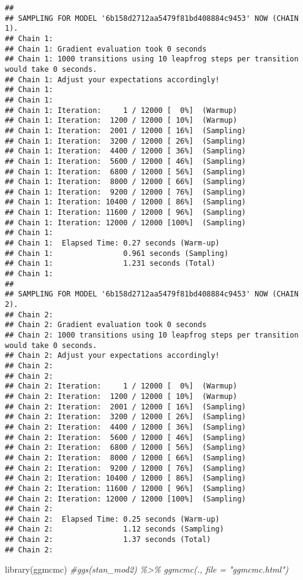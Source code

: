 \documentclass[
]{book}
\newenvironment{Shaded}{\begin{snugshade}}{\end{snugshade}}
\newcommand{\CommentTok}[1]{\textcolor[rgb]{0.56,0.35,0.01}{\textit{#1}}}
\newcommand{\FunctionTok}[1]{\textcolor[rgb]{0.00,0.00,0.00}{#1}}
\newcommand{\NormalTok}[1]{#1}
\begin{document}
\begin{verbatim}
## 
## SAMPLING FOR MODEL '6b158d2712aa5479f81bd408884c9453' NOW (CHAIN 1).
## Chain 1: 
## Chain 1: Gradient evaluation took 0 seconds
## Chain 1: 1000 transitions using 10 leapfrog steps per transition would take 0 seconds.
## Chain 1: Adjust your expectations accordingly!
## Chain 1: 
## Chain 1: 
## Chain 1: Iteration:     1 / 12000 [  0%]  (Warmup)
## Chain 1: Iteration:  1200 / 12000 [ 10%]  (Warmup)
## Chain 1: Iteration:  2001 / 12000 [ 16%]  (Sampling)
## Chain 1: Iteration:  3200 / 12000 [ 26%]  (Sampling)
## Chain 1: Iteration:  4400 / 12000 [ 36%]  (Sampling)
## Chain 1: Iteration:  5600 / 12000 [ 46%]  (Sampling)
## Chain 1: Iteration:  6800 / 12000 [ 56%]  (Sampling)
## Chain 1: Iteration:  8000 / 12000 [ 66%]  (Sampling)
## Chain 1: Iteration:  9200 / 12000 [ 76%]  (Sampling)
## Chain 1: Iteration: 10400 / 12000 [ 86%]  (Sampling)
## Chain 1: Iteration: 11600 / 12000 [ 96%]  (Sampling)
## Chain 1: Iteration: 12000 / 12000 [100%]  (Sampling)
## Chain 1: 
## Chain 1:  Elapsed Time: 0.27 seconds (Warm-up)
## Chain 1:                0.961 seconds (Sampling)
## Chain 1:                1.231 seconds (Total)
## Chain 1: 
## 
## SAMPLING FOR MODEL '6b158d2712aa5479f81bd408884c9453' NOW (CHAIN 2).
## Chain 2: 
## Chain 2: Gradient evaluation took 0 seconds
## Chain 2: 1000 transitions using 10 leapfrog steps per transition would take 0 seconds.
## Chain 2: Adjust your expectations accordingly!
## Chain 2: 
## Chain 2: 
## Chain 2: Iteration:     1 / 12000 [  0%]  (Warmup)
## Chain 2: Iteration:  1200 / 12000 [ 10%]  (Warmup)
## Chain 2: Iteration:  2001 / 12000 [ 16%]  (Sampling)
## Chain 2: Iteration:  3200 / 12000 [ 26%]  (Sampling)
## Chain 2: Iteration:  4400 / 12000 [ 36%]  (Sampling)
## Chain 2: Iteration:  5600 / 12000 [ 46%]  (Sampling)
## Chain 2: Iteration:  6800 / 12000 [ 56%]  (Sampling)
## Chain 2: Iteration:  8000 / 12000 [ 66%]  (Sampling)
## Chain 2: Iteration:  9200 / 12000 [ 76%]  (Sampling)
## Chain 2: Iteration: 10400 / 12000 [ 86%]  (Sampling)
## Chain 2: Iteration: 11600 / 12000 [ 96%]  (Sampling)
## Chain 2: Iteration: 12000 / 12000 [100%]  (Sampling)
## Chain 2: 
## Chain 2:  Elapsed Time: 0.25 seconds (Warm-up)
## Chain 2:                1.12 seconds (Sampling)
## Chain 2:                1.37 seconds (Total)
## Chain 2:
\end{verbatim}

\begin{Shaded}
\begin{Highlighting}[]
\FunctionTok{library}\NormalTok{(ggmcmc)}
\CommentTok{\#ggs(stan\_mod2) \%\textgreater{}\% ggmcmc(., file = "ggmcmc.html")}
\end{Highlighting}
\end{Shaded}
\end{document}
